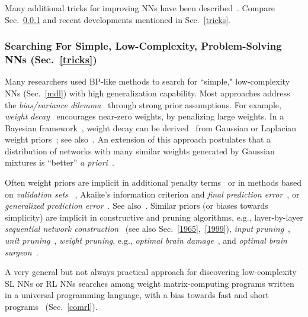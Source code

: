 \documentclass[letterpaper]{article}
\begin{document}
\begin{sloppypar}
Many additional tricks for improving NNs have been described~\citep[e.g.,][]{orr1998neural,tricksofthetrade:2012}.
Compare Sec.~\ref{mdlnn} and recent developments mentioned in Sec.~\ref{tricks}. 

\subsubsection{Searching For Simple, Low-Complexity, Problem-Solving NNs (Sec.~\ref{tricks})}
\label{mdlnn}


Many researchers used BP-like methods to search for
``simple," low-complexity NNs (Sec.~\ref{mdl})
with high generalization capability. Most approaches 
address the {\em bias/variance dilemma}~\citep{Geman:92}
through strong prior 
assumptions. For example, 
{\em weight decay}~\citep{Hanson:89,Weigend:91,Krogh:92} 
encourages near-zero weights, by penalizing large weights. In a Bayesian
framework~\citep{bayes1763}, weight decay can be derived~\citep{Hinton:93} 
from Gaussian or Laplacian weight priors~\citep{gauss1809,laplace1774}; 
see also~\citep{Murray:93}. 
An extension of this approach
postulates that 
a distribution of networks
with many similar weights 
generated by Gaussian mixtures is ``better'' {\em a priori}~\citep{Nowlan:92}.

Often weight priors  are implicit in
additional penalty terms~\citep{MacKay:92b} or
 in methods based on {\em validation sets}
~\citep{Mosteller:68,Stone:74,Eubank:88,Hastie:90,Craven:79,Golub:79},
Akaike's information criterion and
 {\em final prediction error}~\citep{Akaike:70,akaike1973,akaike1974}, or
{\em generalized prediction error}~\citep{Moody:94a,Moody:92}.
See also~\citep{Holden:94,Wang:94,Amari:93,Wang:94,Vapnik:92a,Vapnik:92,Wolpert:94b}.
Similar priors (or biases towards simplicity) are implicit in  constructive and pruning algorithms,
e.g., layer-by-layer 
 {\em sequential network construction}~\citep[e.g.,][]{ivakhnenko1968,ivakhnenko1971,Ash:89,Moody:89,gallant1988,honavar1988,Ring:91,Fahlman:91,weng1992,honavar1993,burgess1994,fritzke94,parekh2000,utgoff2002} (see also Sec.~\ref{1965},~\ref{1999}),
{\em input pruning}~\citep{Moody:92,Refenes:94},
{\em unit pruning}~\citep[e.g.,][]{ivakhnenko1968,ivakhnenko1971,White:89,Mozer:89a,Levin:94},
{\em weight pruning}, e.g., {\em optimal brain damage}~\citep{LeCun:90a},
and {\em optimal brain surgeon}~\citep{Hassibi:93}. 

A very general but not always practical
approach for discovering low-complexity SL NNs or RL NNs searches among weight matrix-computing programs written in a universal programming language, with a bias
towards fast and short programs~\citep{Schmidhuber:97nn+} (Sec.~\ref{comrl}).


\end{sloppypar}
\end{document}
